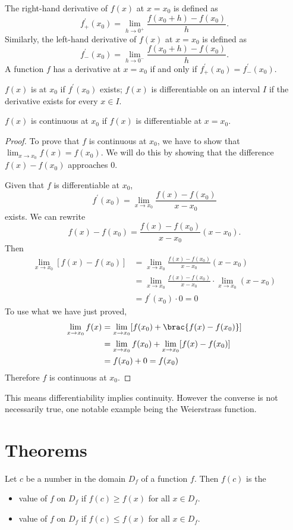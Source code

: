 The right-hand derivative of $f(x)$ at $x=x_0$ is defined as
\[ f_+^\prime(x_0)=\lim_{h\to0^+}\frac{f(x_0+h)-f(x_0)}{h}. \]
Similarly, the left-hand derivative of $f(x)$ at $x=x_0$ is defined as
\[ f_-^\prime(x_0)=\lim_{h\to0^-}\frac{f(x_0+h)-f(x_0)}{h}. \]
A function $f$ has a derivative at $x=x_0$ if and only if $f_+^\prime(x_0)=f_-^\prime(x_0)$.

\begin{definition} 
$f(x)$ is  at $x_0$ if $f^\prime(x_0)$ exists; $f(x)$ is differentiable on an interval $I$ if the derivative exists for every $x\in I$.
\end{definition}

\begin{theorem}
$f(x)$ is continuous at $x_0$ if $f(x)$ is differentiable at $x=x_0$.
\end{theorem}

\begin{proof}
To prove that $f$ is continuous at $x_0$, we have to show that $\lim_{x\to x_0}f(x)=f(x_0)$. We will do this by showing that the difference $f(x)-f(x_0)$ approaches $0$.

Given that $f$ is differentiable at $x_0$,
\[ f^\prime(x_0)=\lim_{x\to x_0}\frac{f(x)-f(x_0)}{x-x_0} \]
exists. We can rewrite
\[ f(x)-f(x_0)=\frac{f(x)-f(x_0)}{x-x_0}(x-x_0). \]
Then
\begin{align*}
\lim_{x\to x_0}[f(x)-f(x_0)]
&=\lim_{x\to x_0}\frac{f(x)-f(x_0)}{x-x_0}(x-x_0)\\
&=\lim_{x\to x_0}\frac{f(x)-f(x_0)}{x-x_0}\cdot\lim_{x\to x_0}(x-x_0)\\
&=f^\prime(x_0)\cdot0=0
\end{align*}
To use what we have just proved, 
\begin{align*}
\lim_{x\to x_0}f(x)
&=\lim_{x\to x_0}[f(x_0)+\brac{f(x)-f(x_0)}]\\
&=\lim_{x\to x_0}f(x_0)+\lim_{x\to x_0}[f(x)-f(x_0)]\\
&=f(x_0)+0=f(x_0)
\end{align*}
Therefore $f$ is continuous at $x_0$.
\end{proof}

\begin{remark}
This means differentiability implies continuity. However the converse is not necessarily true, one notable example being the Weierstrass function.
\end{remark}
\pagebreak

\section{Theorems}
\begin{definition}
Let $c$ be a number in the domain $D_f$ of a function $f$. Then $f(c)$ is the
\begin{itemize}
\item {} value of $f$ on $D_f$ if $f(c)\ge f(x)$ for all $x\in D_f$.
\item {} value of $f$ on $D_f$ if $f(c)\le f(x)$ for all $x\in D_f$.
\end{itemize}
\end{definition}

